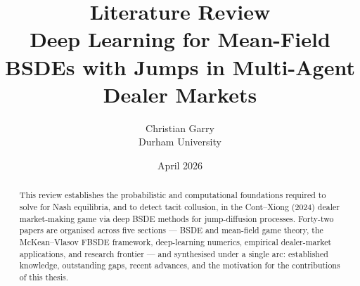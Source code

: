 \documentclass[11pt,a4paper]{article}
\title{Literature Review\\
  \large Deep Learning for Mean-Field BSDEs with Jumps in Multi-Agent Dealer Markets}
\author{Christian Garry\\Durham University}
\date{April 2026}
\begin{document}
\maketitle

\begin{abstract}
\noindent
This review establishes the probabilistic and computational
foundations required to solve for Nash equilibria, and to detect
tacit collusion, in the Cont--Xiong (2024) dealer market-making
game via deep BSDE methods for jump-diffusion processes.
Forty-two papers are organised across five sections --- BSDE and
mean-field game theory, the McKean--Vlasov FBSDE framework,
deep-learning numerics, empirical dealer-market applications, and
research frontier --- and synthesised under a single arc:
established knowledge, outstanding gaps, recent advances, and the
motivation for the contributions of this thesis.
\end{abstract}

\tableofcontents
\vspace{1em}




\end{document}
